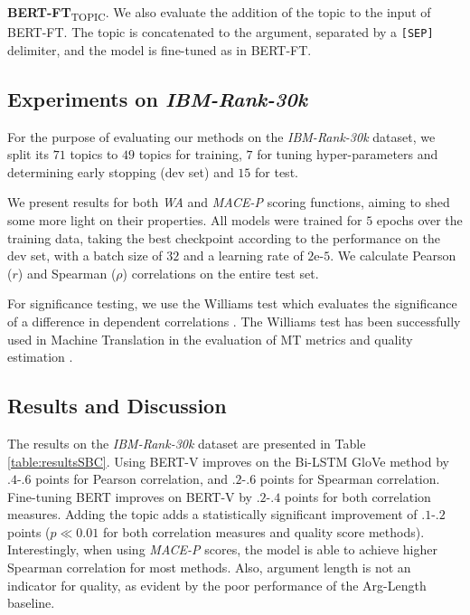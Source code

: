 \documentclass[letterpaper]{article} %
\newcommand{\ourds}{IBM-Rank-30k}
\begin{document}
\textbf{BERT-FT}\textsubscript{TOPIC}. We also evaluate the addition of the topic to the input of BERT-FT. The topic is concatenated to the argument, separated by a \verb|[SEP]| delimiter, and the model is fine-tuned as in BERT-FT.

\subsection{Experiments on \textit{\ourds{}}}
\label{experiments}

For the purpose of evaluating our methods on the \textit{\ourds{}} dataset, we split its $71$ topics to $49$ topics for training, $7$ for tuning hyper-parameters and determining early stopping (dev set) and $15$ for test.

We present results for both \textit{WA} and \textit{MACE-P} scoring functions, aiming to shed some more light on their properties. All models were trained for $5$ epochs over the training data, taking the best checkpoint according to the performance on the dev set, with a batch size of $32$ and a learning rate of $2$e-$5$. We calculate Pearson ($r$) and Spearman ($\rho$) correlations on the entire test set.

For significance testing, we use the Williams test \cite{williams59} which evaluates the significance of a difference in dependent correlations \cite{steiger1980tests}. The Williams test has been successfully used in Machine Translation in the evaluation of MT metrics \cite{Graham14} and quality estimation \cite{Graham15}.

\subsection{Results and Discussion}

The results on the \textit{\ourds{}} dataset are presented in Table \ref{table:resultsSBC}. Using BERT-V improves on the Bi-LSTM GloVe method by $.4$-$.6$ points for Pearson correlation, and $.2$-$.6$ points for Spearman correlation. Fine-tuning BERT improves on BERT-V by $.2$-$.4$ points for both correlation measures. Adding the topic adds a statistically significant improvement of $.1$-$.2$ points ($p\ll0.01$ for both correlation measures and quality score methods). Interestingly, when using \textit{MACE-P} scores, the model is able to achieve higher Spearman correlation for most methods. Also, argument length is not an indicator for quality, as evident by the poor performance of the Arg-Length baseline.
\end{document}
